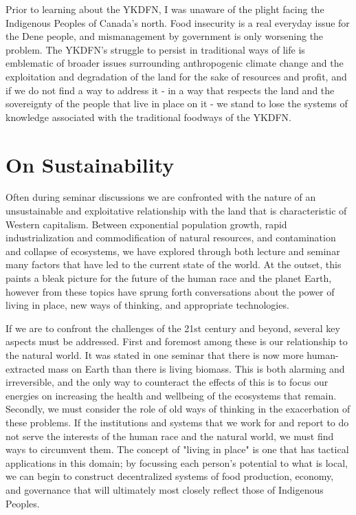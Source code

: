 \documentclass{report}
\begin{document}
\hspace{24pt} Prior to learning about the YKDFN, I was unaware of the plight facing the Indigenous Peoples of Canada's north. Food insecurity is a real everyday issue for the Dene people, and mismanagement by government is only worsening the problem. The YKDFN's struggle to persist in traditional ways of life is emblematic of broader issues surrounding anthropogenic climate change and the exploitation and degradation of the land for the sake of resources and profit, and if we do not find a way to address it - in a way that respects the land and the sovereignty of the people that live in place on it - we stand to lose the systems of knowledge associated with the traditional foodways of the YKDFN.

\section{On Sustainability}



\hspace{24pt} Often during seminar discussions we are confronted with the nature of an unsustainable and exploitative relationship with the land that is characteristic of Western capitalism. Between exponential population growth, rapid industrialization and commodification of natural resources, and contamination and collapse of ecosystems, we have explored through both lecture and seminar many factors that have led to the current state of the world. At the outset, this paints a bleak picture for the future of the human race and the planet Earth, however from these topics have sprung forth conversations about the power of living in place, new ways of thinking, and appropriate technologies.

\hspace{24pt} If we are to confront the challenges of the 21st century and beyond, several key aspects must be addressed. First and foremost among these is our relationship to the natural world. It was stated in one seminar that there is now more human-extracted mass on Earth than there is living biomass. This is both alarming and irreversible, and the only way to counteract the effects of this is to focus our energies on increasing the health and wellbeing of the ecosystems that remain. Secondly, we must consider the role of old ways of thinking in the exacerbation of these problems. If the institutions and systems that we work for and report to do not serve the interests of the human race and the natural world, we must find ways to circumvent them. The concept of "living in place" is one that has tactical applications in this domain; by focussing each person's potential to what is local, we can begin to construct decentralized systems of food production, economy, and governance that will ultimately most closely reflect those of Indigenous Peoples.
\end{document}
